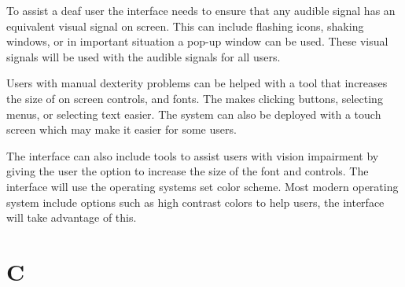\documentclass[12pt]{article}
\begin{document}
To assist a deaf user the interface needs to ensure that any audible signal
has an equivalent visual signal on screen.  This can include flashing 
icons, shaking windows, or in important situation a pop-up window can
be used.  These visual signals will be used with the audible signals for
all users.

Users with manual dexterity problems can be helped with a tool that
increases the size of on screen controls, and fonts.  The makes clicking
buttons, selecting menus, or selecting text easier.  The system can also
be deployed with a touch screen which may make it easier for some users.

The interface can also include tools to assist users with vision 
impairment by giving the user the option to increase the size of the font
and controls.  The interface will use the operating systems set color
scheme.  Most modern operating system include options such as high contrast
colors to help users, the interface will take advantage of this.

\section*{C}
\end{document}
